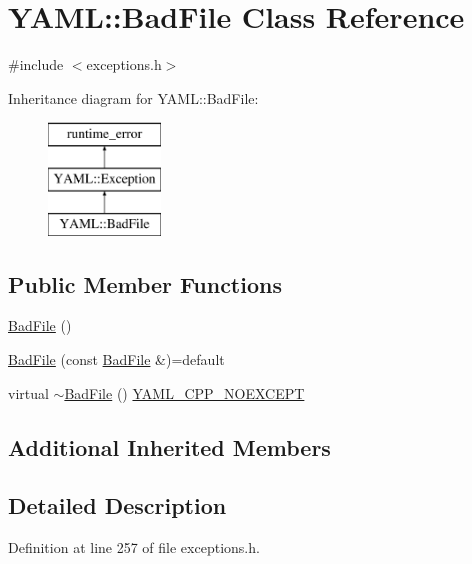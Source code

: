 \hypertarget{class_y_a_m_l_1_1_bad_file}{}\section{Y\+A\+ML\+::Bad\+File Class Reference}
\label{class_y_a_m_l_1_1_bad_file}


{\ttfamily \#include $<$exceptions.\+h$>$}

Inheritance diagram for Y\+A\+ML\+::Bad\+File\+:\begin{figure}[H]
\begin{center}
\leavevmode
\includegraphics[height=3.000000cm]{class_y_a_m_l_1_1_bad_file}
\end{center}
\end{figure}
\subsection*{Public Member Functions}
\begin{DoxyCompactItemize}
\item 
\mbox{\hyperlink{class_y_a_m_l_1_1_bad_file_a3a1c7d671955a43693e4ed9b4f9966de}{Bad\+File}} ()
\item 
\mbox{\hyperlink{class_y_a_m_l_1_1_bad_file_a7fa6e06c3fe955f7bff500d9cf553f6d}{Bad\+File}} (const \mbox{\hyperlink{class_y_a_m_l_1_1_bad_file}{Bad\+File}} \&)=default
\item 
virtual \mbox{\hyperlink{class_y_a_m_l_1_1_bad_file_a954c85cdaba3c4c111abdf0b74a47fff}{$\sim$\+Bad\+File}} () \mbox{\hyperlink{exceptions_8cpp_a4ea58eb0a28000364858d4942add7d1a}{Y\+A\+M\+L\+\_\+\+C\+P\+P\+\_\+\+N\+O\+E\+X\+C\+E\+PT}}
\end{DoxyCompactItemize}
\subsection*{Additional Inherited Members}


\subsection{Detailed Description}


Definition at line 257 of file exceptions.\+h.



